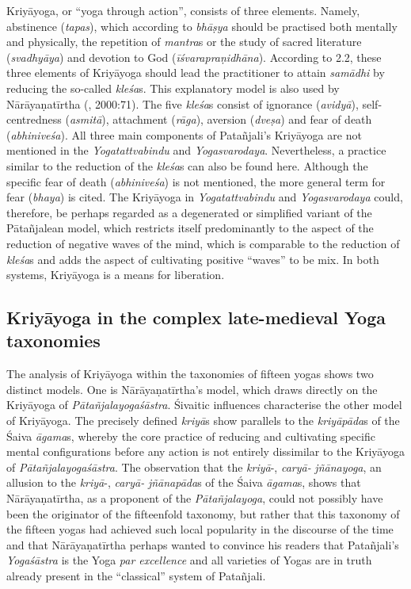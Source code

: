 Kriyāyoga, or ``yoga through action'', consists of three elements. Namely, abstinence (\textit{tapas}), which according to \textit{bhāṣya} should be practised both mentally and physically, the repetition of \textit{mantra}s or the study of sacred literature (\textit{svadhyāya}) and devotion to God (\textit{īśvarapraṇidhāna}).
According to  2.2, these three elements of Kriyāyoga should lead the practitioner to attain \textit{samādhi} by reducing the so-called \textit{kleśa}s. This explanatory model is also used by Nārāyaṇatīrtha (\citeauthor{yogacandrika}, 2000:71). The five \textit{kleśa}s consist of ignorance (\textit{avidyā}), self-centredness (\textit{asmitā}), attachment (\textit{rāga}), aversion (\textit{dveṣa}) and fear of death (\textit{abhiniveśa}). 
All three main components of Patañjali's Kriyāyoga are not mentioned in the \textit{Yogatattvabindu} and \textit{Yogasvarodaya}. Nevertheless, a practice similar to the reduction of the \textit{kleśa}s can also be found here. Although the specific fear of death (\textit{abhiniveśa}) is not mentioned, the more general term for fear (\textit{bhaya}) is cited.
The Kriyāyoga in \textit{Yogatattvabindu} and \textit{Yogasvarodaya} could, therefore, be perhaps regarded as a degenerated or simplified variant of the Pātañjalean model, which restricts itself predominantly to the aspect of the reduction of negative waves of the mind, which is comparable to the reduction of \textit{kleśa}s and adds the aspect of cultivating positive ``waves'' to be mix. In both systems, Kriyāyoga is a means for liberation.

\subsection{Kriyāyoga in the complex late-medieval Yoga taxonomies}

The analysis of Kriyāyoga within the taxonomies of fifteen yogas shows two distinct models. One is Nārāyaṇatīrtha's model, which draws directly on the Kriyāyoga of \textit{Pātañjalayogaśāstra}. Śivaitic influences characterise the other model of Kriyāyoga. The precisely defined \textit{kriyā}s show parallels to the \textit{kriyāpāda}s of the Śaiva \textit{āgama}s, whereby the core practice of reducing and cultivating specific mental configurations before any action is not entirely dissimilar to the Kriyāyoga of \textit{Pātañjalayogaśāstra}. The observation that the \textit{kriyā}-, \textit{caryā-} \textit{jñānayoga}, an allusion to the \textit{kriyā}-, \textit{caryā-} \textit{jñānapāda}s of the Śaiva \textit{āgama}s, shows that Nārāyaṇatīrtha, as a proponent of the \textit{Pātañjalayoga}, could not possibly have been the originator of the fifteenfold taxonomy, but rather that this taxonomy of the fifteen yogas had achieved such local popularity in the discourse of the time and that Nārāyaṇatīrtha perhaps wanted to convince his readers that Patañjali's \textit{Yogaśāstra} is the Yoga \textit{par excellence} and all varieties of Yogas are in truth already present in the ``classical'' system of Patañjali.  





